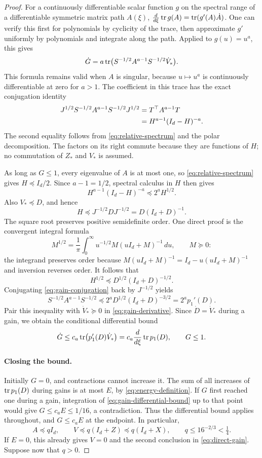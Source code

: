 \begin{proof}
For a continuously differentiable scalar function $g$ on the spectral
range of a differentiable symmetric matrix path $A(\xi)$,
$\frac{d}{d\xi}\operatorname{tr} g(A)=\operatorname{tr}(g'(A)\dot A)$. One can verify this first
for polynomials by cyclicity of the trace, then approximate $g'$ uniformly
by polynomials and integrate along the path. Applied to $g(u)=u^a$, this gives
\begin{equation}
 \dot G
   =a\operatorname{tr}\bigl(S^{-1/2}A^{a-1}S^{-1/2}\dot V_*\bigr).
 \label{eq:gain-derivative}
\end{equation}
This formula remains valid when $A$ is singular, because
$u\mapsto u^a$ is continuously differentiable at zero for $a>1$.
The coefficient in this trace has the exact conjugation identity
\begin{align}
 J^{1/2}S^{-1/2}A^{a-1}S^{-1/2}J^{1/2}
   &=T^\top A^{a-1}T\notag\\
   &=H^{a-1}(I_d-H)^{-a}.
 \label{eq:gain-conjugation}
\end{align}
The second equality follows from \eqref{eq:relative-spectrum} and
the polar decomposition.  The factors on its right commute because
they are functions of $H$; no commutation of $Z_*$ and $V_*$ is
assumed.

As long as $G\le1$, every eigenvalue of $A$ is at most one, so
\eqref{eq:relative-spectrum} gives $H\preceq I_d/2$.  Since
$a-1=1/2$, spectral calculus in $H$ then gives
\[
 H^{a-1}(I_d-H)^{-a}\preceq2^aH^{1/2}.
\]
Also $V_*\preceq D$, and hence
\[
 H\preceq J^{-1/2}DJ^{-1/2}=D(I_d+D)^{-1}.
\]
The square root preserves positive semidefinite order.  One direct
proof is the convergent integral formula
\[
 M^{1/2}=\frac1\pi\int_0^\infty
       u^{-1/2}M(uI_d+M)^{-1}\,du,
       \qquad M\succeq0:
\]
the integrand preserves order because
$M(uI_d+M)^{-1}=I_d-u(uI_d+M)^{-1}$ and inversion reverses order.
It follows that
\[
 H^{1/2}\preceq D^{1/2}(I_d+D)^{-1/2}.
\]
Conjugating \eqref{eq:gain-conjugation} back by $J^{-1/2}$ yields
\[
 S^{-1/2}A^{a-1}S^{-1/2}
   \preceq2^aD^{1/2}(I_d+D)^{-3/2}=2^ap_1'(D).
\]
Pair this inequality with $\dot V_*\succeq0$ in
\eqref{eq:gain-derivative}.  Since $\dot D=\dot V_*$ during a gain,
we obtain the conditional differential bound
\begin{equation}
 \dot G\le c_a\operatorname{tr}\bigl(p_1'(D)\dot V_*\bigr)
       =c_a\frac{d}{d\xi}\operatorname{tr} p_1(D),
       \qquad G\le1.
 \label{eq:gain-differential-bound}
\end{equation}

\paragraph{Closing the bound.}
Initially $G=0$, and contractions cannot increase it.  The sum of
all increases of $\operatorname{tr} p_1(D)$ during gains is at most $E$, by
\eqref{eq:energy-definition}.  If $G$ first reached one during a
gain, integration of \eqref{eq:gain-differential-bound} up to that
point would give $G\le c_aE\le1/16$, a contradiction.
Thus the differential bound applies throughout, and
$G\le c_aE$ at the endpoint.  In particular,
\[
 A\preceq qI_d,\qquad
 V\preceq q(I_d+Z)\preceq q(I_d+X),\qquad
 q\le16^{-2/3}<\tfrac14.
\]
If $E=0$, this already gives $V=0$ and the second conclusion in
\eqref{eq:direct-gain}.  Suppose now that $q>0$.


\end{proof}
